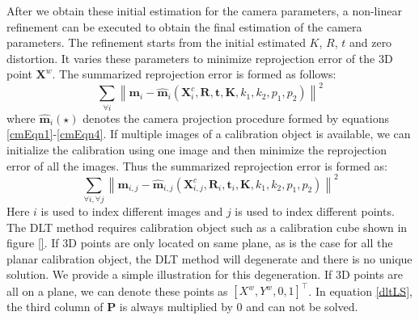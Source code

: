\documentclass{report}
\begin{document}
After we obtain these initial estimation for the camera parameters, a non-linear refinement can be executed to obtain the final estimation of the camera parameters. The refinement starts from the initial estimated $K$, $R$, $t$ and zero distortion. It varies these parameters to minimize reprojection error of the 3D point $\mathbf{X}^w$. The summarized reprojection error is formed as follows: 
\begin{equation}
\sum_{\forall i} \left \| \mathbf{m}_i - \hat{\mathbf{m}}_i(\mathbf{X}^c_i, \mathbf{R}, \mathbf{t}, \mathbf{K}, k_1, k_2, p_1, p_2) \right \|^2
\label{dltOptEqn}
\end{equation}
where $\hat{\mathbf{m}}_i(\star)$ denotes the camera projection procedure formed by equations \ref{cmEqn1}-\ref{cmEqn4}. If multiple images of a calibration object is available, we can initialize the calibration using one image and then minimize the reprojection error of all the images. Thus the summarized reprojection error is formed as: 
\begin{equation}
\sum_{\forall i, \forall j} \left \| \mathbf{m}_{i, j} - \hat{\mathbf{m}}_{i, j} (\mathbf{X}^c_{i, j}, \mathbf{R}_i, \mathbf{t}_i, \mathbf{K}, k_1, k_2, p_1, p_2) \right \|^2
\label{dltAllOptEqn}
\end{equation}
Here $i$ is used to index different images and $j$ is used to index different points. The DLT method requires calibration object such as a calibration cube shown in figure \ref{}. If 3D points are only located on same plane, as is the case for all the planar calibration object, the DLT method will degenerate and there is no unique solution. We provide a simple illustration for this degeneration. If 3D points are all on a plane, we can denote these points as $[X^w, Y^w, 0, 1]^\top$. In equation \ref{dltLS}, the third column of $\mathbf{P}$ is always multiplied by 0 and can not be solved. 
\end{document}

